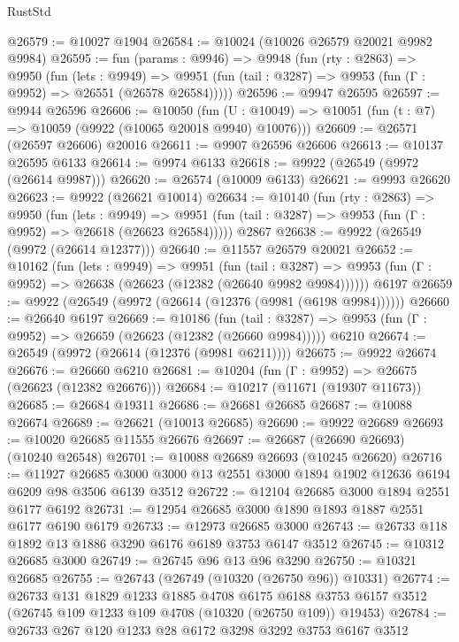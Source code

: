 \begin{lexlean}{RustStd}
\begin{coremodule}
@26579 := @10027 @1904
@26584 := @10024 (@10026 @26579 @20021 @9982 @9984)
@26595 := fun (params : @9946) =>
  @9948
    (fun (rty : @2863) =>
    @9950
      (fun (lets : @9949) =>
      @9951 (fun (tail : @3287) => @9953 (fun (Γ : @9952) => @26551 (@26578 @26584)))))
@26596 := @9947 @26595
@26597 := @9944 @26596
@26606 := @10050
    (fun (U : @10049) => @10051 (fun (t : @7) => @10059 (@9922 (@10065 @20018 @9940) @10076)))
@26609 := @26571 (@26597 @26606) @20016
@26611 := @9907 @26596 @26606
@26613 := @10137 @26595 @6133
@26614 := @9974 @6133
@26618 := @9922 (@26549 (@9972 (@26614 @9987)))
@26620 := @26574 (@10009 @6133)
@26621 := @9993 @26620
@26623 := @9922 (@26621 @10014)
@26634 := @10140
    (fun (rty : @2863) =>
    @9950
      (fun (lets : @9949) =>
      @9951 (fun (tail : @3287) => @9953 (fun (Γ : @9952) => @26618 (@26623 @26584)))))
    @2867
@26638 := @9922 (@26549 (@9972 (@26614 @12377)))
@26640 := @11557 @26579 @20021
@26652 := @10162
    (fun (lets : @9949) =>
    @9951
      (fun (tail : @3287) =>
      @9953 (fun (Γ : @9952) => @26638 (@26623 (@12382 (@26640 @9982 @9984))))))
    @6197
@26659 := @9922 (@26549 (@9972 (@26614 (@12376 (@9981 (@6198 @9984))))))
@26660 := @26640 @6197
@26669 := @10186
    (fun (tail : @3287) => @9953 (fun (Γ : @9952) => @26659 (@26623 (@12382 (@26660 @9984)))))
    @6210
@26674 := @26549 (@9972 (@26614 (@12376 (@9981 @6211))))
@26675 := @9922 @26674
@26676 := @26660 @6210
@26681 := @10204 (fun (Γ : @9952) => @26675 (@26623 (@12382 @26676)))
@26684 := @10217 (@11671 (@19307 @11673))
@26685 := @26684 @19311
@26686 := @26681 @26685
@26687 := @10088 @26674
@26689 := @26621 (@10013 @26685)
@26690 := @9922 @26689
@26693 := @10020 @26685 @11555 @26676
@26697 := @26687 (@26690 @26693) (@10240 @26548)
@26701 := @10088 @26689 @26693 (@10245 @26620)
@26716 := @11927
    @26685
    @3000
    @3000
    @13
    @2551
    @3000
    @1894
    @1902
    @12636
    @6194
    @6209
    @98
    @3506
    @6139
    @3512
@26722 := @12104 @26685 @3000 @1894 @2551 @6177 @6192
@26731 := @12954 @26685 @3000 @1890 @1893 @1887 @2551 @6177 @6190 @6179
@26733 := @12973 @26685 @3000
@26743 := @26733 @118 @1892 @13 @1886 @3290 @6176 @6189 @3753 @6147 @3512
@26745 := @10312 @26685 @3000
@26749 := @26745 @96 @13 @96 @3290
@26750 := @10321 @26685
@26755 := @26743 (@26749 (@10320 (@26750 @96)) @10331)
@26774 := @26733
    @131
    @1829
    @1233
    @1885
    @4708
    @6175
    @6188
    @3753
    @6157
    @3512
    (@26745 @109 @1233 @109 @4708 (@10320 (@26750 @109)) @19453)
@26784 := @26733 @267 @120 @1233 @28 @6172 @3298 @3292 @3753 @6167 @3512

\end{coremodule}
\end{lexlean}
